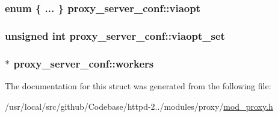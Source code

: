 \subsubsection[{\texorpdfstring{viaopt}{viaopt}}]{\setlength{\rightskip}{0pt plus 5cm}enum \{ ... \}   proxy\+\_\+server\+\_\+conf\+::viaopt}\hypertarget{structproxy__server__conf_afc8fee1717b19fca5aa8334e2d30f6e1}{}\label{structproxy__server__conf_afc8fee1717b19fca5aa8334e2d30f6e1}
\subsubsection[{\texorpdfstring{viaopt\+\_\+set}{viaopt_set}}]{\setlength{\rightskip}{0pt plus 5cm}unsigned {\bf int} proxy\+\_\+server\+\_\+conf\+::viaopt\+\_\+set}\hypertarget{structproxy__server__conf_a1ba22b835203162fef728c90362c6f29}{}\label{structproxy__server__conf_a1ba22b835203162fef728c90362c6f29}
\subsubsection[{\texorpdfstring{workers}{workers}}]{$\ast$ proxy\+\_\+server\+\_\+conf\+::workers}\hypertarget{structproxy__server__conf_a233902252764d689aac3aa47b1af406c}{}\label{structproxy__server__conf_a233902252764d689aac3aa47b1af406c}


The documentation for this struct was generated from the following file\+:\begin{DoxyCompactItemize}
\item 
/usr/local/src/github/\+Codebase/httpd-\/2../modules/proxy/\hyperlink{mod__proxy_8h}{mod\+\_\+proxy.\+h}\end{DoxyCompactItemize}
